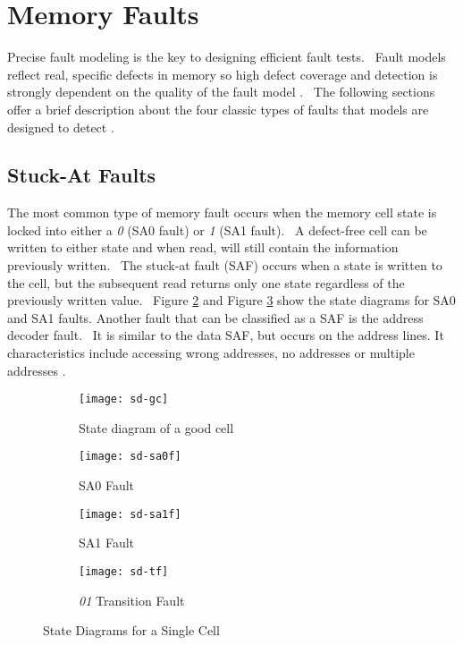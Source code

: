 \section{Memory Faults}
\label{sect:bg-faults}
Precise fault modeling is the key to designing efficient fault tests.  Fault models reflect real, specific defects in memory so high defect coverage and detection is strongly dependent on the quality of the fault model \cite{1327984}.  The following sections offer a brief description about the four classic types of faults that models are designed to detect \cite{Adams2003}.  

\subsection{Stuck-At Faults}
The most common type of memory fault occurs when the memory cell state is locked into either a \textit{0} (SA0 fault) or \textit{1} (SA1 fault).  A defect-free cell can be written to either state and when read, will still contain the information previously written.  The stuck-at fault (SAF) occurs when a state is written to the cell, but the subsequent read returns only one state regardless of the previously written value.  Figure \ref{fig:sd-sa0f} and Figure \ref{fig:sd-sa1f} show the state diagrams for SA0 and SA1 faults.  Another fault that can be classified as a SAF is the address decoder fault.  It is similar to the data SAF, but occurs on the address lines.  It characteristics include accessing wrong addresses, no addresses or multiple addresses \cite{VanDeGoor1991}.
\begin{figure}[H]
  \centering
  \begin{subfigure}[b]{0.5\textwidth}
    \texttt{[image: sd-gc]}
    \caption{State diagram of a good cell}
    \label{fig:sd-gc}
  \end{subfigure}  
  
  \begin{subfigure}[b]{0.25\textwidth}
    \texttt{[image: sd-sa0f]}
    \caption{SA0 Fault}
    \label{fig:sd-sa0f}
  \end{subfigure}  
  \begin{subfigure}[b]{0.25\textwidth}
    \texttt{[image: sd-sa1f]}
    \caption{SA1 Fault}
    \label{fig:sd-sa1f}
  \end{subfigure}  
  
  \begin{subfigure}[b]{0.5\textwidth}
    \texttt{[image: sd-tf]}
    \caption{\textit{01} Transition Fault}
    \label{fig:sd-tf}
  \end{subfigure}  

  \caption[State Diagrams for a Single Cell]{State Diagrams for a Single Cell \cite{VanDeGoor1991}}
  \label{fig:sd-sc}
\end{figure}

